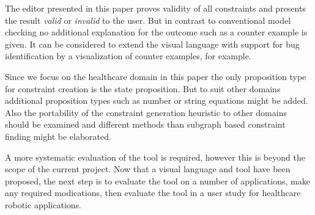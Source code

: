 \documentclass[conference]{IEEEtran}
\begin{document}
The editor presented in this paper proves validity of all constraints and presents the result \emph{valid} or \emph{invalid} to the user. But in contrast to conventional model checking no additional explanation for the outcome such as a counter example is given. It can be considered to extend the visual language with support for bug identification by a visualization of counter examples, for example.




Since we focus on the healthcare domain in this paper the only proposition type for constraint creation is the state proposition. But to suit other domains additional proposition types such as number or string equations might be added. Also the portability of the constraint generation heuristic to other domains should be examined and different methods than subgraph based constraint finding might be elaborated.


A more systematic evaluation of the tool is required, however this is beyond the scope of the current project. Now that a visual language and tool have been proposed, the next step is to evaluate the tool on a number of applications, make any required modications, then evaluate the tool in a user study for healthcare robotic applications. 	
\end{document}
